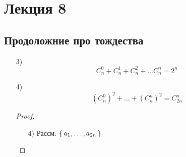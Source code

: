 \section{Лекция 8}
\subsection{Продоложние про тождества}
\begin{itemize}
  \item [3) ]
\[
  C_{n}^{0} + C_{n}^{1} + C_{n}^{2} + \ldots C_{n}^{n} = 2^{n}
\]
\item [4) ] \[
    (C_{n}^{0})^{2} + \ldots + (C_{n}^{n})^{2} = C_{2n}^{n}
\]
\begin{proof}
\begin{itemize}
  \item [4) ] Рассм. $\set{a_1, \ldots, a_{2n}}$ \\


\end{itemize}
\end{proof}
\end{itemize}
